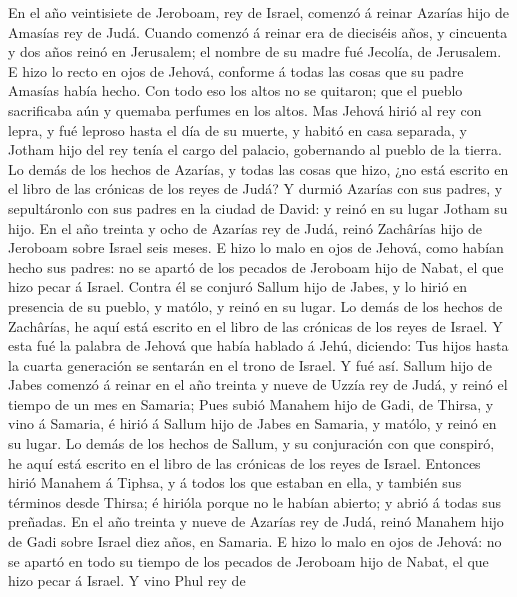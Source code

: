  En el año veintisiete de Jeroboam, rey de Israel, comenzó á
reinar Azarías hijo de Amasías rey de Judá.  Cuando comenzó
á reinar era de dieciséis años, y cincuenta y dos años reinó en
Jerusalem; el nombre de su madre fué Jecolía, de Jerusalem. 
E hizo lo recto en ojos de Jehová, conforme á todas las cosas que su
padre Amasías había hecho.  Con todo eso los altos no se
quitaron; que el pueblo sacrificaba aún y quemaba perfumes en los altos.
 Mas Jehová hirió al rey con lepra, y fué leproso hasta el
día de su muerte, y habitó en casa separada, y Jotham hijo del rey tenía
el cargo del palacio, gobernando al pueblo de la tierra.  Lo
demás de los hechos de Azarías, y todas las cosas que hizo, ¿no está
escrito en el libro de las crónicas de los reyes de Judá?  Y
durmió Azarías con sus padres, y sepultáronlo con sus padres en la
ciudad de David: y reinó en su lugar Jotham su hijo.  En el
año treinta y ocho de Azarías rey de Judá, reinó Zachârías hijo de
Jeroboam sobre Israel seis meses.  E hizo lo malo en ojos de
Jehová, como habían hecho sus padres: no se apartó de los pecados de
Jeroboam hijo de Nabat, el que hizo pecar á Israel.  Contra
él se conjuró Sallum hijo de Jabes, y lo hirió en presencia de su
pueblo, y matólo, y reinó en su lugar.  Lo demás de los
hechos de Zachârías, he aquí está escrito en el libro de las crónicas de
los reyes de Israel.  Y esta fué la palabra de Jehová que
había hablado á Jehú, diciendo: Tus hijos hasta la cuarta generación se
sentarán en el trono de Israel. Y fué así.  Sallum hijo de
Jabes comenzó á reinar en el año treinta y nueve de Uzzía rey de Judá, y
reinó el tiempo de un mes en Samaria;  Pues subió Manahem
hijo de Gadi, de Thirsa, y vino á Samaria, é hirió á Sallum hijo de
Jabes en Samaria, y matólo, y reinó en su lugar.  Lo demás
de los hechos de Sallum, y su conjuración con que conspiró, he aquí está
escrito en el libro de las crónicas de los reyes de Israel.
 Entonces hirió Manahem á Tiphsa, y á todos los que estaban
en ella, y también sus términos desde Thirsa; é hirióla porque no le
habían abierto; y abrió á todas sus preñadas.  En el año
treinta y nueve de Azarías rey de Judá, reinó Manahem hijo de Gadi sobre
Israel diez años, en Samaria.  E hizo lo malo en ojos de
Jehová: no se apartó en todo su tiempo de los pecados de Jeroboam hijo
de Nabat, el que hizo pecar á Israel.  Y vino Phul rey de
